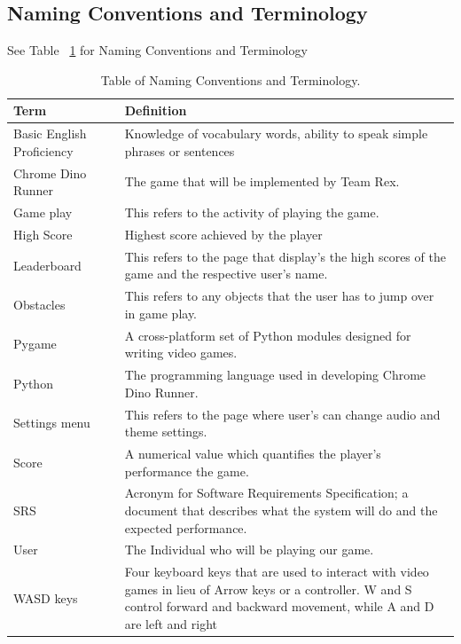 \documentclass[12pt]{article}
\begin{document}
\subsection{Naming Conventions and Terminology}
See Table ~\ref{table:naming} for Naming Conventions and Terminology
\begin{table}[] 
\centering
\caption{Table of Naming Conventions and Terminology.}
\begin{tabular}{l c p{}}
\toprule
Term       && Definition \\
\midrule
Basic English Proficiency && Knowledge of vocabulary words, ability to speak simple phrases or sentences \\
\midrule
Chrome Dino Runner  && The game that will be implemented by Team Rex. \\
\midrule
Game play && This refers to the activity of playing the game. \\
\midrule
High Score          && Highest score achieved by the player \\
\midrule

Leaderboard && This refers to the page that display's the high scores of the game and the respective user's name. \\
\midrule 
Obstacles && This refers to any objects that the user has to jump over in game play. \\
\midrule
Pygame              && A cross-platform set of Python modules designed for writing video games. \\
\midrule
Python              && The programming language used in developing Chrome Dino Runner. \\
\midrule

Settings menu && This refers to the page where user's can change audio and theme settings. \\
\midrule
Score               && A numerical value which quantifies the player's performance the game. \\
\midrule
SRS       && Acronym for Software Requirements Specification; a document that describes what the system will do and the expected performance. \\
\midrule
User       && The Individual who will be playing  our game. \\
\midrule
WASD keys           && Four keyboard keys that are used to interact with video games in lieu of Arrow keys or a controller. W and S control forward and backward movement, while A and D are left and right \\


\bottomrule
\end{tabular}
\label{table:naming}
\end{table}
\end{document}
